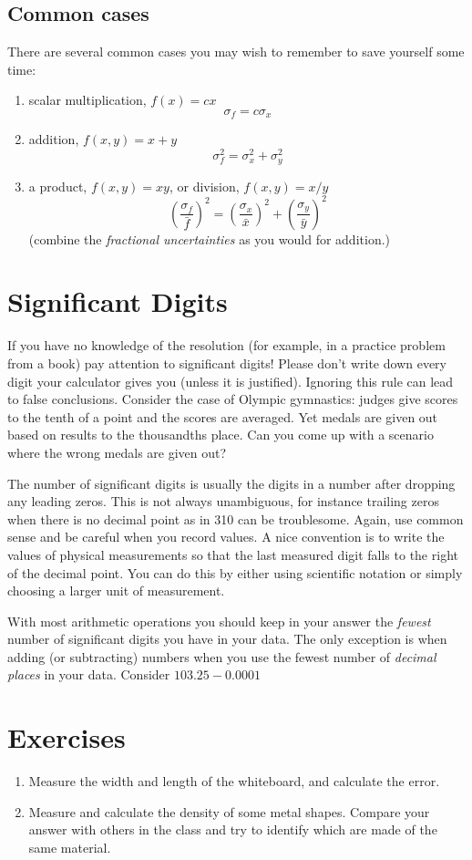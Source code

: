\documentclass{article}
\begin{document}
\subsection{Common cases}
There are several common cases you may wish to remember to save yourself some time:
\begin{enumerate}
\item scalar multiplication, $f(x) = cx$
\[
\sigma_f = c\sigma_x
\]
\item addition, $f(x,y) = x + y$
\[
\sigma_f^2 = \sigma_x^2 + \sigma_y^2
\]
\item a product, $f(x,y) = xy$, or division, $f(x,y) = x/y$
\[
\left( \frac{\sigma_f}{\bar{f}} \right)^2 = \left( \frac{\sigma_x}{\bar{x}} \right)^2 + \left( \frac{\sigma_y}{\bar{y}} \right)^2
\]
(combine the {\em fractional uncertainties} as you would for addition.)
\end{enumerate}


\section{Significant Digits}

If you have no knowledge of the resolution (for example, in a practice problem from a book) pay attention to significant digits!  Please don't write down every digit your calculator gives you (unless it is justified).  Ignoring this rule can lead to false conclusions.  Consider the case of Olympic gymnastics: judges give scores to the tenth of a point and the scores are averaged.  Yet medals are given out based on results to the thousandths place.  Can you come up with a scenario where the wrong medals are given out?

The number of significant digits is usually the digits in a number after dropping any leading zeros.  This is not always unambiguous, for instance trailing zeros when there is no decimal point as in 310 can be troublesome.  Again, use common sense and be careful when you record values.  A nice convention is to write the values of physical measurements so that the last measured digit falls to the right of the decimal point.  You can do this by either using scientific notation or simply choosing a larger unit of measurement.

With most arithmetic operations you should keep in your answer the {\em fewest} number of significant digits you have in your data.  The only exception is when adding (or subtracting) numbers when you use the fewest number of {\em decimal places} in your data.  Consider $103.25 - 0.0001$

\section{Exercises}

\begin{enumerate}
\item Measure the width and length of the whiteboard, and calculate the error.
\item Measure and calculate the density of some metal shapes.  Compare your answer with others in the class and try to identify which are made of the same material.


\end{enumerate}
\end{document}
